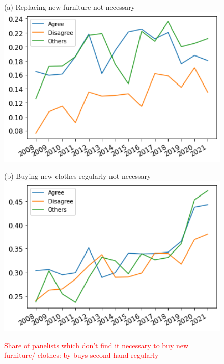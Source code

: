 \documentclass[12pt]{article}
\newcommand{\tr}[1]{\textcolor{red}{#1}}
\begin{document}
\begin{figure}[h!!]
	\centering	
	\caption{\tr{Share of panelists which don't find it necessary to buy new furniture/ clothes: by buys second hand regularly }}\label{fig:evolution_notNecessary_bygroup:2ndHand}	
	\begin{minipage}[h!!]{0.32\textwidth}  
		\centering\footnotesize{(a) Replacing new furniture not necessary}
		\includegraphics[width=1\textwidth]{../codding_data/results/liss/broad_groups_notnecessaryqk20a135_ci307.png}
	\end{minipage}
	\begin{minipage}[h!!]{0.32\textwidth}
		\centering\footnotesize{(b) Buying new clothes regularly not necessary}
		\includegraphics[width=1\textwidth]{../codding_data/results/liss/broad_groups_notnecessaryqk20a135_ci306.png}
	\end{minipage}
\end{figure}
\end{document}
